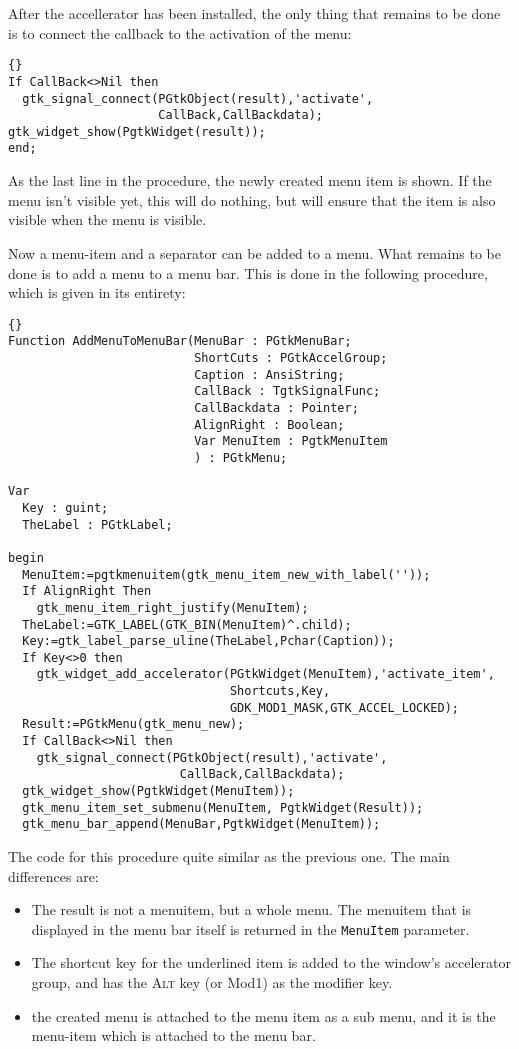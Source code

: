 \documentclass[10pt]{article}
\begin{document}
After the accellerator has been installed, the only thing that remains to be
done is to connect the callback to the activation of the menu:
\begin{lstlisting}{}
If CallBack<>Nil then
  gtk_signal_connect(PGtkObject(result),'activate',
                     CallBack,CallBackdata);
gtk_widget_show(PgtkWidget(result));  
end;
\end{lstlisting}
As the last line in the procedure, the newly created menu item is shown.
If the menu isn't visible yet, this will do nothing, but will ensure that
the item is also visible when the menu is visible.

Now a menu-item and a separator can be added to a menu. What remains to be
done is to add a menu to a menu bar. This is done in the following
procedure, which is given in its entirety:
\begin{lstlisting}{}
Function AddMenuToMenuBar(MenuBar : PGtkMenuBar;
                          ShortCuts : PGtkAccelGroup;
                          Caption : AnsiString;
                          CallBack : TgtkSignalFunc;
                          CallBackdata : Pointer;   
                          AlignRight : Boolean;     
                          Var MenuItem : PgtkMenuItem
                          ) : PGtkMenu; 

Var
  Key : guint;
  TheLabel : PGtkLabel;

begin
  MenuItem:=pgtkmenuitem(gtk_menu_item_new_with_label(''));
  If AlignRight Then
    gtk_menu_item_right_justify(MenuItem);
  TheLabel:=GTK_LABEL(GTK_BIN(MenuItem)^.child);
  Key:=gtk_label_parse_uline(TheLabel,Pchar(Caption));
  If Key<>0 then
    gtk_widget_add_accelerator(PGtkWidget(MenuItem),'activate_item',
                               Shortcuts,Key,
                               GDK_MOD1_MASK,GTK_ACCEL_LOCKED);
  Result:=PGtkMenu(gtk_menu_new);
  If CallBack<>Nil then
    gtk_signal_connect(PGtkObject(result),'activate',
                        CallBack,CallBackdata);
  gtk_widget_show(PgtkWidget(MenuItem));  
  gtk_menu_item_set_submenu(MenuItem, PgtkWidget(Result));
  gtk_menu_bar_append(MenuBar,PgtkWidget(MenuItem));
\end{lstlisting}
The code for this procedure quite similar as the previous one. The main
differences are:
\begin{itemize}
\item The result is not a menuitem, but a whole menu. The menuitem that is
displayed in the menu bar itself is returned in the \lstinline|MenuItem|
parameter.
\item The shortcut key for the underlined item is added to the window's
accelerator group, and has the \textsc{Alt} key (or \textsf{Mod1}) as 
the modifier key.
\item the created menu is attached to the menu item as a sub menu, and it is
the menu-item which is attached to the menu bar.
\end{itemize}
\end{document}
